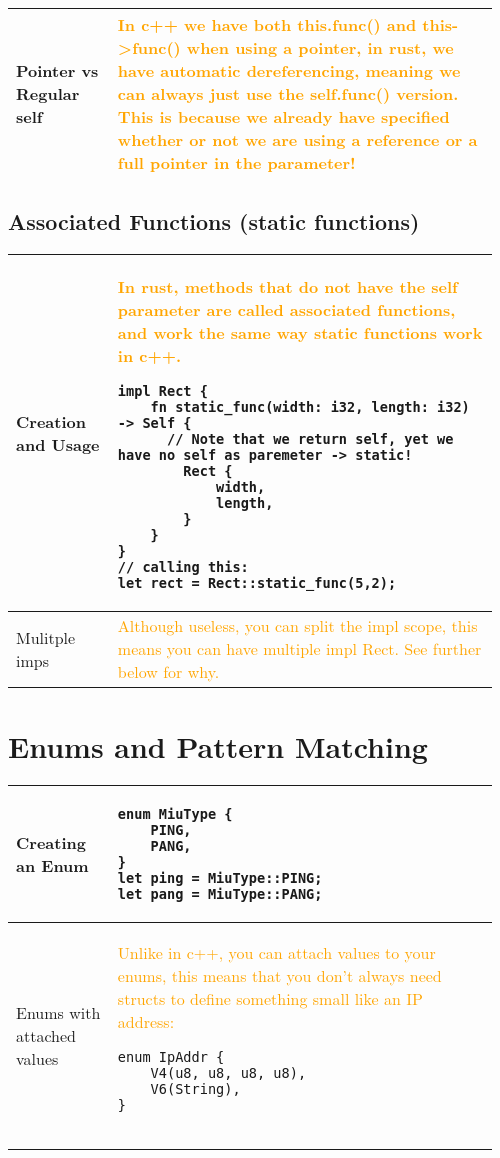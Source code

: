 \documentclass[main.tex,fontsize=8pt,paper=a4,paper=portrait,DIV=calc,]{scrartcl}
\begin{document}
\begin{table}[ht!]
\begin{tabular}{|m{0.2\linewidth}|m{0.755\linewidth}|}
\hline
Pointer vs Regular self &
\textcolor{orange}{In c++ we have both this.func() and this->func() when using a pointer, in rust, we have \textbf{automatic dereferencing}, meaning we can always just use the self.func() version.\newline
This is because we already have specified whether or not we are using a reference or a full pointer in the parameter!}\\
\hline
\end{tabular}
\subsection{Associated Functions (static functions)}
\begin{tabular}{|m{0.2\linewidth}|m{0.755\linewidth}|}
\hline
Creation and Usage & 
\textcolor{orange}{In rust, methods that do not have the self parameter are called associated functions, and work the same way static functions work in c++.}\newline 
\begin{lstlisting}
impl Rect {
    fn static_func(width: i32, length: i32) -> Self { 
      // Note that we return self, yet we have no self as paremeter -> static! 
        Rect {
            width,
            length,
        }
    }
}
// calling this:
let rect = Rect::static_func(5,2);
\end{lstlisting}\\
\hline
Mulitple imps & 
\textcolor{orange}{Although useless, you can split the impl scope, this means you can have multiple impl Rect. \newline 
See further below for why.}\\
\hline
\end{tabular}
\section{Enums and Pattern Matching}
\begin{tabular}{|m{0.2\linewidth}|m{0.755\linewidth}|}
\hline
Creating an Enum &
\begin{lstlisting}
enum MiuType {
    PING,
    PANG,
}
let ping = MiuType::PING;
let pang = MiuType::PANG;
\end{lstlisting}\\
\hline
Enums with attached values & 
\textcolor{orange}{Unlike in c++, you can attach values to your enums, this means that you don't always need structs to define something small like an IP address:}\newline
\begin{lstlisting}
enum IpAddr {
    V4(u8, u8, u8, u8),
    V6(String),
}


\end{lstlisting}
\end{tabular}
\end{table}
\end{document}
